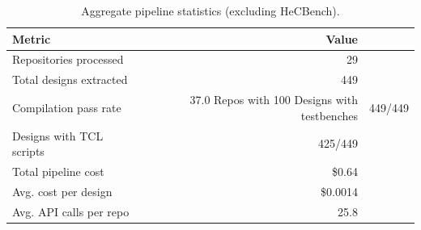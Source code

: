 \begin{table}[t]
\centering
\caption{Aggregate pipeline statistics (excluding HeCBench).}
\label{tab:summary}
\begin{tabular}{lr}
\toprule
\textbf{Metric} & \textbf{Value} \\
\midrule
Repositories processed & 29 \\
Total designs extracted & 449 \\
Compilation pass rate & 37.0%
Repos with 100%
Designs with testbenches & 449/449 \\
Designs with TCL scripts & 425/449 \\
Total pipeline cost & \$0.64 \\
Avg. cost per design & \$0.0014 \\
Avg. API calls per repo & 25.8 \\
\bottomrule
\end{tabular}
\end{table}